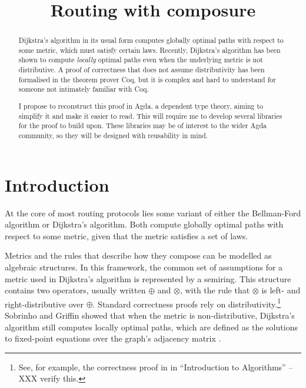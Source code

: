 \documentclass[a4paper]{scrartcl}
\title{\phantomsection%
  Routing with composure%
  \label{generalised-big-operators-in-agda}}
\author{}
\date{}
\begin{document}
\maketitle


\begin{abstract}
Dijkstra's algorithm in its usual form computes globally optimal paths with respect to some metric, which must satisfy certain laws. Recently, Dijkstra's algorithm has been shown to compute \emph{locally} optimal paths even when the underlying metric is not distributive. A proof of correctness that does not assume distributivity has been formalised in the theorem prover Coq, but it is complex and hard to understand for someone not intimately familiar with Coq.

I propose to reconstruct this proof in Agda, a dependent type theory, aiming to simplify it and make it easier to read. This will require me to develop several libraries for the proof to build upon. These libraries may be of interest to the wider Agda community, so they will be designed with reusability in mind.
\end{abstract}


\section{Introduction%
  \label{introduction}%
}

At the core of most routing protocols lies some variant of either the Bellman-Ford algorithm or Dijkstra's algorithm. Both compute globally optimal paths with respect to some metric, given that the metric satisfies a set of laws.

Metrics and the rules that describe how they compose can be modelled as algebraic structures. In this framework, the common set of assumptions for a metric used in Dijkstra's algorithm is represented by a semiring. This structure contains two operators, usually written \(\oplus\) and \(\otimes\), with the rule that \(\otimes\) is left- and right-distributive over \(\oplus\). Standard correctness proofs rely on distributivity.\footnote{See, for example, the correctness proof in in \enquote{Introduction to Algorithms} \autocite[XXX]{cormen_introduction_2009} -- XXX verify this.} Sobrinho and Griffin showed that when the metric is non-distributive, Dijkstra's algorithm still computes locally optimal paths, which are defined as the solutions to fixed-point equations over the graph's adjacency matrix \autocite{sobrinho_routing_2010}.
\end{document}
